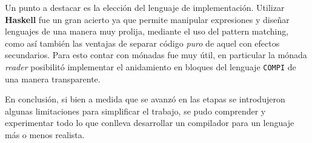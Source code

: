 \documentclass[a4paper,10pt]{article}
\begin{document}
Un punto a destacar es la elección del lenguaje de implementación. Utilizar \textbf{Haskell} fue un gran acierto ya que permite manipular expresiones y 
diseñar lenguajes de una manera muy prolija, mediante el uso del pattern matching, como así también las ventajas de separar código \textit{puro} de aquel
con efectos secundarios. Para esto contar con mónadas fue muy útil, en particular la mónada \textit{reader} posibilitó implementar el anidamiento
en bloques del lenguaje \verb|COMPI| de una manera transparente.

En conclusión, si bien a medida que se avanzó en las etapas se introdujeron algunas limitaciones para simplificar el trabajo, se pudo comprender y experimentar
todo lo que conlleva desarrollar un compilador para un lenguaje más o menos realista.

\newpage


\end{document}
